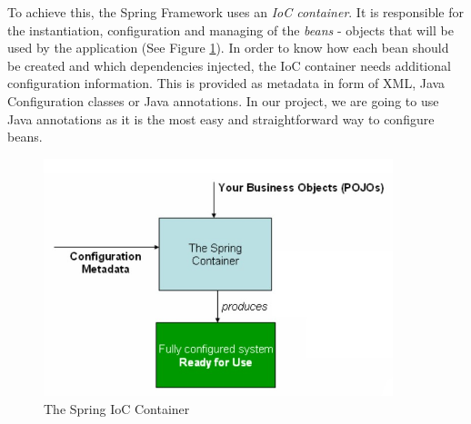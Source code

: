 To achieve this, the Spring Framework uses an \textit{IoC container}. It is responsible for the instantiation, configuration and managing of the \textit{beans} - objects that will be used by the application (See Figure \ref{springIocContainer}). In order to know how each bean should be created and which dependencies injected, the IoC container needs additional configuration information. This is provided as metadata in form of XML, Java Configuration classes or Java annotations. In our project, we are going to use Java annotations as it is the most easy and straightforward way to configure beans.

\begin{figure}[H]
    \centering
    \includegraphics[width=4in]{images/springIocContainer}
    \caption{The Spring IoC Container \cite{springDocs}}
    \label{springIocContainer}
\end{figure}








